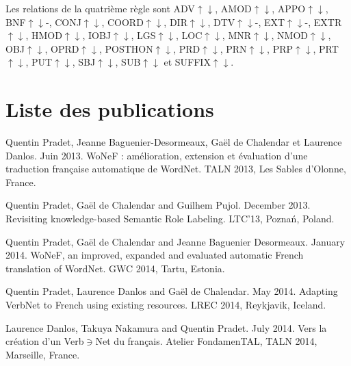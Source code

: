 \documentclass[oneside,parskip,draft]{scrbook}
\begin{document}
Les relations de la quatrième règle sont ADV$\uparrow\downarrow$,
AMOD$\uparrow\downarrow$, APPO$\uparrow\downarrow$, BNF$\uparrow\downarrow$-,
CONJ$\uparrow\downarrow$, COORD$\uparrow\downarrow$, DIR$\uparrow\downarrow$,
DTV$\uparrow\downarrow$-, EXT$\uparrow\downarrow$-, EXTR$\uparrow\downarrow$,
HMOD$\uparrow\downarrow$, IOBJ$\uparrow\downarrow$, LGS$\uparrow\downarrow$,
LOC$\uparrow\downarrow$, MNR$\uparrow\downarrow$, NMOD$\uparrow\downarrow$,
OBJ$\uparrow\downarrow$, OPRD$\uparrow\downarrow$, POSTHON$\uparrow\downarrow$,
PRD$\uparrow\downarrow$, PRN$\uparrow\downarrow$, PRP$\uparrow\downarrow$,
PRT$\uparrow\downarrow$, PUT$\uparrow\downarrow$, SBJ$\uparrow\downarrow$,
SUB$\uparrow\downarrow$ et SUFFIX$\uparrow\downarrow$.

\chapter{Liste des publications}

Quentin Pradet, Jeanne Baguenier-Desormeaux, Gaël de Chalendar et Laurence Danlos. Juin 2013. WoNeF : amélioration, extension et évaluation d’une traduction française automatique de WordNet. TALN 2013, Les Sables d'Olonne, France.

Quentin Pradet, Gaël de Chalendar and Guilhem Pujol. December 2013. Revisiting knowledge-based Semantic Role Labeling. LTC'13, Poznań, Poland.

Quentin Pradet, Gaël de Chalendar and Jeanne Baguenier Desormeaux. January 2014. WoNeF, an improved, expanded and evaluated automatic French translation of WordNet. GWC 2014, Tartu, Estonia.

Quentin Pradet, Laurence Danlos and Gaël de Chalendar. May 2014. Adapting VerbNet to French using existing resources. LREC 2014, Reykjavik, Iceland.

Laurence Danlos, Takuya Nakamura and Quentin Pradet. July 2014. Vers la création d’un Verb$\ni$Net du français. Atelier FondamenTAL, TALN 2014, Marseille, France.


\end{document}
